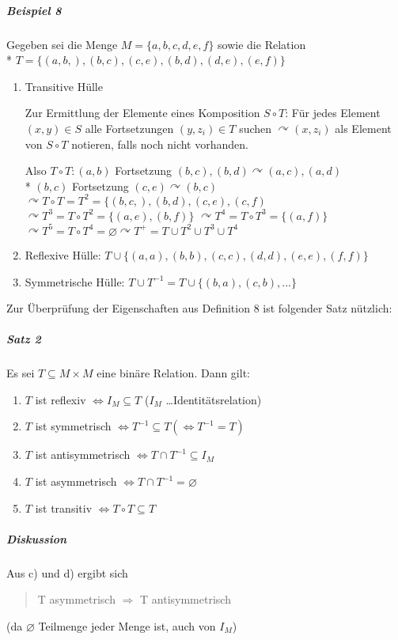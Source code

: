\documentclass[a4paper]{scrartcl}
\begin{document}
\subparagraph{Beispiel 8} Gegeben sei die Menge $M =\{ a,b,c,d,e,f\}$ sowie die Relation\\* $T=\{(a,b,),(b,c),(c,e),(b,d),(d,e),(e,f)\}$
\begin{enumerate}
\item Transitive Hülle

Zur Ermittlung der Elemente eines Komposition $S \circ T$: Für jedes Element $(x,y)\in S$ alle Fortsetzungen $(y,z_i)\in T$ suchen $\curvearrowright (x,z_i)$ als Element von $S \circ T$ notieren, falls noch nicht vorhanden.

Also $T\circ T: (a,b)$ Fortsetzung $(b,c),(b,d) \curvearrowright (a,c),(a,d)$ \\* $(b,c)$ Fortsetzung $(c,e) \curvearrowright (b,c)$\\
$\curvearrowright T \circ T = T^2 = \{(b,c,),(b,d),(c,e),(c,f)$
$\curvearrowright T^3 = T\circ T^2=\{(a,e),(b,f)\}$
$\curvearrowright T^4 = T\circ T^3 =\{ (a,f)\}$
$\curvearrowright T^5 = T\circ T^4 = \varnothing \curvearrowright T^+ = T\cup T^2 \cup T^3 \cup T^4$

\item Reflexive Hülle: $T\cup \{(a,a),(b,b),(c,c),(d,d),(e,e),(f,f)\}$
\item Symmetrische Hülle: $T\cup T^{-1} = T \cup \{(b,a),(c,b),...\}$
\end{enumerate}

Zur Überprüfung der Eigenschaften aus Definition 8 ist folgender Satz nützlich:
\subparagraph{Satz 2} Es sei $T \subseteq M \times M$ eine binäre Relation. Dann gilt:
\begin{enumerate}
\item $T$ ist reflexiv $\Leftrightarrow I_M \subseteq T$ ($I_M$ \dots Identitätsrelation)
\item $T$ ist symmetrisch $\Leftrightarrow T^{-1} \subseteq T ( \Leftrightarrow T^{-1} = T)$
\item $T$ ist antisymmetrisch $\Leftrightarrow T \cap T^{-1} \subseteq I_M$ \label{c)}
\item $T$ ist asymmetrisch $\Leftrightarrow T \cap T^{-1} = \varnothing$
\item $T$ ist transitiv $\Leftrightarrow T\circ T \subseteq T$
\end{enumerate}

\subparagraph{Diskussion} Aus c) und d) ergibt sich
\begin{quote}
T asymmetrisch $\Rightarrow$ T antisymmetrisch
\end{quote}
(da $\varnothing$ Teilmenge jeder Menge ist, auch von $I_M$)
\end{document}
